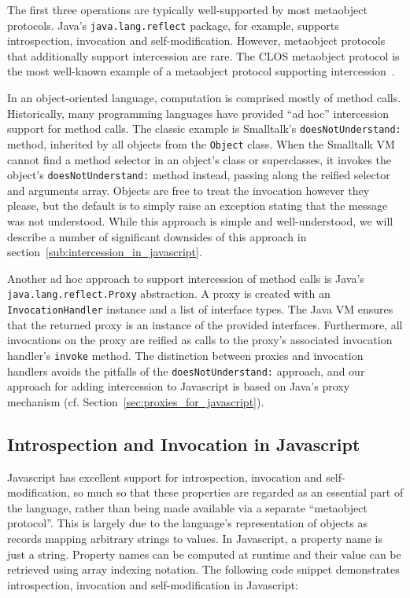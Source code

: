 \documentclass{acm_proc_article-sp}
\begin{document}
The first three operations are typically well-supported by most metaobject protocols. Java's \texttt{java.lang.reflect} package, for example, supports introspection, invocation and self-modification. However, metaobject protocols that additionally support intercession are rare. The CLOS metaobject protocol is the most well-known example of a metaobject protocol supporting intercession~\cite{clos}.

In an object-oriented language, computation is comprised mostly of method calls. Historically, many programming languages have provided ``ad hoc'' intercession support for method calls. The classic example is Smalltalk's \texttt{doesNotUnderstand:} method, inherited by all objects from the \texttt{Object} class. When the Smalltalk VM cannot find a method selector in an object's class or superclasses, it invokes the object's \texttt{doesNotUnderstand:} method instead, passing along the reified selector and arguments array. Objects are free to treat the invocation however they please, but the default is to simply raise an exception stating that the message was not understood. While this approach is simple and well-understood, we will describe a number of significant downsides of this approach in section~\ref{sub:intercession_in_javascript}.

Another ad hoc approach to support intercession of method calls is Java's \texttt{java.lang.reflect.Proxy} abstraction. A proxy is created with an \texttt{InvocationHandler} instance and a list of interface types. The Java VM ensures that the returned proxy is an instance of the provided interfaces. Furthermore, all invocations on the proxy are reified as calls to the proxy's associated invocation handler's \texttt{invoke} method. The distinction between proxies and invocation handlers avoids the pitfalls of the \texttt{doesNotUnderstand:} approach, and our approach for adding intercession to Javascript is based on Java's proxy mechanism (cf. Section~\ref{sec:proxies_for_javascript}).

\subsection{Introspection and Invocation in Javascript}

Javascript has excellent support for introspection, invocation and self-modification, so much so that these properties are regarded as an essential part of the language, rather than being made available via a separate ``metaobject protocol''. This is largely due to the language's representation of objects as records mapping arbitrary strings to values. In Javascript, a property name is just a string. Property names can be computed at runtime and their value can be retrieved using array indexing notation. The following code snippet demonstrates introspection, invocation and self-modification in Javascript:
\end{document}
